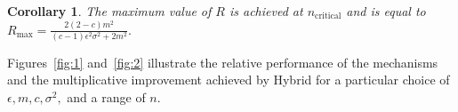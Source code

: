 \documentclass{article}
\newcommand\TODO[1]{\textcolor{red}{TODO: {#1}}}
\theoremstyle{plain}
\newtheorem*{cor}{Corollary}
\begin{document}

\begin{cor}
The maximum value of $R$ is achieved at $n_{\text{critical}}$ and is equal to $R_{\text{max}} = \frac{2 (2-c) m^2}{(c-1) \epsilon^2 \sigma^2+2 m^2}.$
\end{cor}

Figures~\ref{fig:1} and~\ref{fig:2} illustrate the relative performance of the mechanisms and the multiplicative improvement achieved by Hybrid for a particular choice of $\epsilon, m, c, \sigma^2,$ and a range of $n$.

\end{document}
